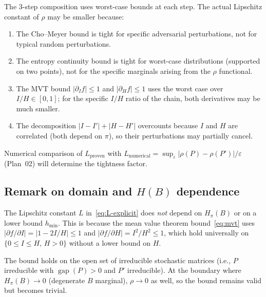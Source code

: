 \documentclass[11pt]{article}
\DeclareMathOperator{\gap}{gap}
\begin{document}
The 3-step composition uses worst-case bounds at each step.  The
actual Lipschitz constant of $\rho$ may be smaller because:
\begin{enumerate}
  \item[(a)] The Cho--Meyer bound is tight for specific adversarial
    perturbations, not for typical random perturbations.
  \item[(b)] The entropy continuity bound is tight for worst-case
    distributions (supported on two points), not for the
    specific marginals arising from the $\rho$ functional.
  \item[(c)] The MVT bound $|\partial_I f| \le 1$ and $|\partial_H f| \le 1$
    uses the worst case over $I/H \in [0,1]$; for the specific
    $I/H$ ratio of the chain, both derivatives may be much smaller.
  \item[(d)] The decomposition $|I-I'| + |H-H'|$ overcounts because
    $I$ and $H$ are correlated (both depend on $\pi$), so their
    perturbations may partially cancel.
\end{enumerate}

Numerical comparison of $L_{\text{proven}}$ with
$L_{\text{numerical}} = \sup_{\varepsilon} |\rho(P) - \rho(P')|/\varepsilon$
(Plan~02) will determine the tightness factor.

\subsection{Remark on domain and $H(B)$ dependence}

The Lipschitz constant $L$ in~\eqref{eq:L-explicit} does \emph{not}
depend on $H_\pi(B)$ or on a lower bound $h_{\min}$.  This is because
the mean value theorem bound~\eqref{eq:mvt} uses
$|\partial f/\partial I| = |1 - 2I/H| \le 1$ and
$|\partial f/\partial H| = I^2/H^2 \le 1$, which hold universally
on $\{0 \le I \le H,\, H > 0\}$ without a lower bound on $H$.

The bound holds on the open set of irreducible stochastic matrices
(i.e., $P$ irreducible with $\gap(P) > 0$ and $P'$ irreducible).
At the boundary where $H_\pi(B) \to 0$ (degenerate $B$ marginal),
$\rho \to 0$ as well, so the bound remains valid but becomes trivial.

\end{document}
